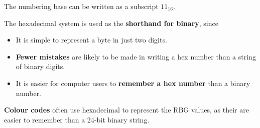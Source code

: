 The numbering base can be written as a subscript $11_\text{16}$.

The hexadecimal system is used as the \textbf{shorthand for binary}, since
\begin{itemize}
    \item It is simple to represent a byte in just two digits.
    \item \textbf{Fewer mistakes} are likely to be made in writing a hex number than a string of binary digits.
    \item It is easier for computer users to \textbf{remember a hex number} than a binary number.
\end{itemize}
\textbf{Colour codes} often use hexadecimal to represent the RBG values, as their are easier to remember than a 24-bit binary string.
